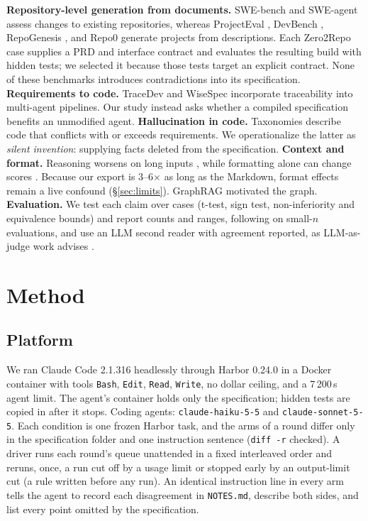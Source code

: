 \documentclass{article}
\newcommand{\code}[1]{\texttt{#1}}
\begin{document}
\textbf{Repository-level generation from documents.} SWE-bench \citep{jimenez2024swebench} and SWE-agent
\citep{yang2024sweagent} assess changes to existing repositories, whereas ProjectEval \citep{liu2025projecteval}, DevBench
\citep{kumarappan2026devbench}, RepoGenesis \citep{peng2026repogenesis}, and Repo0 \citep{chen2026repo0}
generate projects from descriptions. Each Zero2Repo case \citep{yang2026zero2repo} supplies a PRD and interface contract and evaluates the resulting build with hidden tests; we selected it because those tests target an explicit contract.
None of these benchmarks introduces contradictions into its specification. \textbf{Requirements to code.} TraceDev
\citep{chen2026tracedev} and WiseSpec \citep{tian2026wisespec} incorporate traceability into
multi-agent pipelines. Our study instead asks whether a compiled specification benefits an unmodified agent.
\textbf{Hallucination in code.} Taxonomies \citep{liu2024halucode,zhang2025hallucination,lee2025hallucination}
describe code that conflicts with or exceeds requirements. We operationalize the latter as \emph{silent
invention}: supplying facts deleted from the specification. \textbf{Context and format.} Reasoning worsens on long inputs
\citep{liu2024lost,levy2024moretokens}, while formatting alone can change scores
\citep{he2024format,sclar2024format}. Because our export is 3--6$\times$ as long as the Markdown, format effects remain a
live confound (\S\ref{sec:limits}). GraphRAG \citep{edge2024graphrag} motivated the graph.
\textbf{Evaluation.} We test each claim over cases (t-test, sign test, non-inferiority and equivalence
bounds) and report counts and ranges, following \citet{miller2024errorbars} on small-$n$ evaluations, and use
an LLM second reader with agreement reported, as LLM-as-judge work advises
\citep{zheng2023judge,crupi2025judge}.

\section{Method}

\subsection{Platform}

We ran Claude Code 2.1.316 headlessly through Harbor 0.24.0 \citep{harbor_docs} in a Docker container with tools
\code{Bash}, \code{Edit}, \code{Read}, \code{Write}, no dollar ceiling, and a 7\,200\,s agent limit. The agent's
container holds only the specification; hidden tests are copied in after it stops. Coding agents:
\code{claude-haiku-5-5} and \code{claude-sonnet-5-5}. Each condition is one frozen Harbor task, and the arms of
a round differ only in the specification folder and one instruction sentence (\code{diff -r} checked). A
driver runs each round's queue unattended in a fixed interleaved order and reruns, once, a run cut off by
a usage limit or stopped early by an output-limit cut (a rule written before any run). An identical instruction line in every arm tells the agent to record each disagreement in \code{NOTES.md}, describe both sides, and list every point omitted by the specification.
\end{document}
